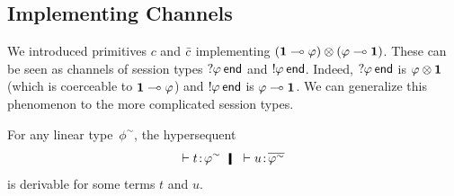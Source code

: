     \subsection{Implementing Channels}
    We introduced primitives $c$ and $\bar{c}$ implementing
    $(\mathbf{1}\multimap\varphi)\otimes(\varphi\multimap\mathbf{1})$.
    These can be seen as channels of session types
    $\mathop{?}\kern -2pt{\varphi}\hskip 2pt{\mathsf{end}}$ and $\mathop{!}\kern -2pt{\varphi}\hskip 2pt{\mathsf{end}}$.
    Indeed, $\mathop{?}\kern -2pt{\varphi}\hskip 2pt{\mathsf{end}}$ is $\varphi\otimes\mathbf{1}$ (which is
    coerceable to $\mathbf{1}\multimap\varphi$) and $\mathop{!}\kern -2pt{\varphi}\hskip 2pt{\mathsf{end}}$ is
    $\varphi\multimap \mathbf{1}$.
    We can generalize this phenomenon to the more complicated session
    types.
     \begin{proposition}
      For any linear type~$\phi^\sim$\kern -2pt, the hypersequent
      \[
       \tr\tj{t}{\phi^\sim}\hmid \tr\tj{u}{\overline{\phi^\sim}}
      \]
      is derivable for some terms $t$ and $u$.
     \end{proposition}
